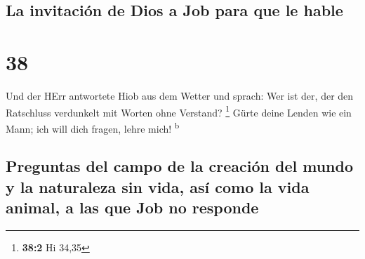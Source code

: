 \hypertarget{la-invitaciuxf3n-de-dios-a-job-para-que-le-hable}{%
\subsection{La invitación de Dios a Job para que le
hable}\label{la-invitaciuxf3n-de-dios-a-job-para-que-le-hable}}

\hypertarget{section-37}{%
\section{38}\label{section-37}}

 Und der HErr antwortete Hiob aus dem Wetter und sprach:
 Wer ist der, der den Ratschluss verdunkelt mit Worten
ohne Verstand? \footnote{\textbf{38:2} Hi 34,35}  Gürte
deine Lenden wie ein Mann; ich will dich fragen, lehre mich!
\textsuperscript{b}

\hypertarget{preguntas-del-campo-de-la-creaciuxf3n-del-mundo-y-la-naturaleza-sin-vida-asuxed-como-la-vida-animal-a-las-que-job-no-responde}{%
\subsection{Preguntas del campo de la creación del mundo y la naturaleza
sin vida, así como la vida animal, a las que Job no
responde}\label{preguntas-del-campo-de-la-creaciuxf3n-del-mundo-y-la-naturaleza-sin-vida-asuxed-como-la-vida-animal-a-las-que-job-no-responde}}

